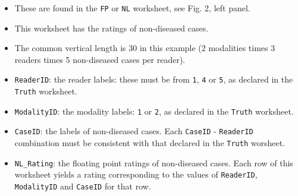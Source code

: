\documentclass[]{book}
\newenvironment{Shaded}{\begin{snugshade}}{\end{snugshade}}
\newcommand{\CommentTok}[1]{\textcolor[rgb]{0.56,0.35,0.01}{\textit{#1}}}
\newcommand{\DecValTok}[1]{\textcolor[rgb]{0.00,0.00,0.81}{#1}}
\newcommand{\NormalTok}[1]{#1}
\newcommand{\OperatorTok}[1]{\textcolor[rgb]{0.81,0.36,0.00}{\textbf{#1}}}
\providecommand{\tightlist}{%
  \setlength{\itemsep}{0pt}\setlength{\parskip}{0pt}}
\begin{document}
\begin{itemize}
\tightlist
\item
  These are found in the \texttt{FP} or \texttt{NL} worksheet, see Fig. 2, left panel.
\item
  This worksheet has the ratings of non-diseased cases.
\item
  The common vertical length is 30 in this example (2 modalities times 3 readers times 5 non-diseased cases per reader).
\item
  \texttt{ReaderID}: the reader labels: these must be from \texttt{1}, \texttt{4} or \texttt{5}, as declared in the \texttt{Truth} worksheet.
\item
  \texttt{ModalityID}: the modality labels: \texttt{1} or \texttt{2}, as declared in the \texttt{Truth} worksheet.
\item
  \texttt{CaseID}: the labels of non-diseased cases. Each \texttt{CaseID} - \texttt{ReaderID} combination must be consistent with that declared in the \texttt{Truth} worsheet.\\
\item
  \texttt{NL\_Rating}: the floating point ratings of non-diseased cases. Each row of this worksheet yields a rating corresponding to the values of \texttt{ReaderID}, \texttt{ModalityID} and \texttt{CaseID} for that row.
\end{itemize}

\begin{Shaded}
\end{Shaded}
\end{document}
